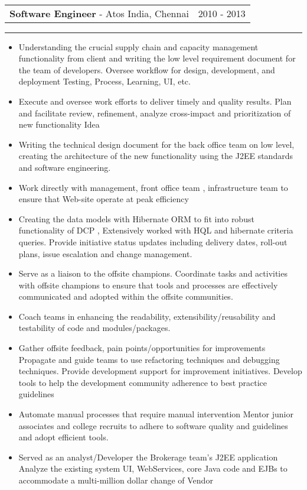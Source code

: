 \documentclass[10pt,A4]{article}
\newcommand{\cvevent}[4]
{

\begin{tabular*}{1\textwidth}{p{13.6cm}  x{3.9cm}}
	\textbf{#2} - \textcolor{bgcol}{#3} &   \vspace{2.0pt}\textcolor{sectcol}{#1}
\end{tabular*}

\vspace{-8pt}
\textcolor{softcol}{\hrule}
\vspace{6pt}

  #4 

}
\begin{document}
\ \\ 

\cvevent{2010 - 2013}
{Software Engineer}
{Atos India, Chennai}
{

\begin{itemize}
\item Understanding the crucial supply chain and capacity management functionality from
client and writing the low level requirement document for the team of developers.
Oversee workflow for design, development, and deployment Testing, Process, Learning,
UI, etc.
\item Execute and oversee work efforts to deliver timely and quality results.
Plan and facilitate review, refinement, analyze cross-impact and prioritization of new
functionality Idea
\item Writing the technical design document for the back office team on low level, creating
the architecture of the new functionality using the J2EE standards and software
engineering.
\item Work directly with management, front office team , infrastructure team to ensure that
Web-site operate at peak efficiency
\item Creating the data models with Hibernate ORM to fit into robust functionality of DCP ,
Extensively worked with HQL and hibernate criteria queries.
Provide initiative status updates including delivery dates, roll-out plans, issue escalation
and change management.
\item Serve as a liaison to the offsite champions. Coordinate tasks and activities with offsite
champions to ensure that tools and processes are effectively communicated and
adopted within the offsite communities.
\item Coach teams in enhancing the readability, extensibility/reusability and testability of
code and modules/packages.
\item Gather offsite feedback, pain points/opportunities for improvements
Propagate and guide teams to use refactoring techniques and debugging techniques.
Provide development support for improvement initiatives.
Develop tools to help the development community adherence to best practice
guidelines
\item Automate manual processes that require manual intervention
Mentor junior associates and college recruits to adhere to software quality and
guidelines and adopt efficient tools.
\item Served as an analyst/Developer the Brokerage team's J2EE application
Analyze the existing system UI, WebServices, core Java code and EJBs to accommodate
a multi-million dollar change of Vendor


\end{itemize}}
\end{document}

